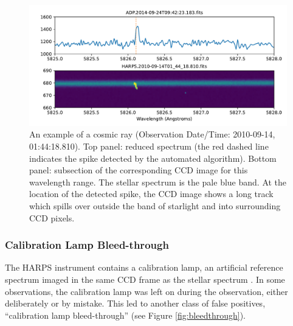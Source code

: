 \documentclass[twocolumn]{aastex701}
\begin{document}
\begin{figure}
    \centering
    \includegraphics[width=\textwidth]{clean-figures/Cosmic_ray_example.pdf}
    \caption{An example of a cosmic ray (Observation Date/Time: 2010-09-14, 01:44:18.810). Top panel: reduced spectrum (the red dashed line indicates the spike detected by the automated algorithm).  Bottom panel: subsection of the corresponding CCD image for this wavelength range. The stellar spectrum is the pale blue band. At the location of the detected spike, the CCD image shows a long track which spills over outside the band of starlight and into surrounding CCD pixels.  }  
    \label{fig:Cosmic_ray_example}
\end{figure}

\subsubsection{Calibration Lamp Bleed-through}
\label{s:bleedthrough}
 The HARPS instrument contains a calibration lamp, an artificial reference spectrum imaged in the same CCD frame as the stellar spectrum \citep{HARPS_specs}. In some observations, the calibration lamp was left on during the observation, either deliberately or by mistake.  This led to another class of false positives, ``calibration lamp bleed-through'' (see Figure \ref{fig:bleedthrough}).
 
\end{document}
